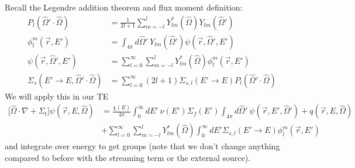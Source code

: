 \documentclass[12pt]{article}
\newcommand{\vOmega}{\ensuremath{\hat{\Omega}}}
\begin{document}
Recall the Legendre addition theorem and flux moment definition:
\begin{align*}
P_l(\vOmega' \cdot \vOmega) &= \frac{1}{2l+1}\sum_{m=-l}^l Y^*_{lm}(\vOmega)Y_{lm}(\vOmega')\\
\phi_{l}^{m}(\vec{r},E') &= \int_{4 \pi} d\vOmega'\: Y_{lm}(\vOmega') \psi(\vec{r}, \vOmega', E') \\
\psi(\vec{r}, \vOmega', E') &= \sum_{l=0}^{\infty} \sum_{m=-l}^l Y^*_{lm}(\vOmega)\phi_{l}^{m}(\vec{r},E')\\
\Sigma_s(E'\rightarrow E, \vOmega' \cdot \vOmega) &= \sum_{l=0}^{\infty} (2l+1) \Sigma_{s,l}(E'\rightarrow E) P_l(\vOmega' \cdot \vOmega)
\end{align*}
We will apply this in our TE 
%
\begin{align*}
\bigl[\vOmega \cdot \nabla + \Sigma_t\bigr] \psi(\vec{r}, E, \vOmega) &= \frac{\chi(E)}{4 \pi}\int_0^{\infty} dE' \: \nu(E') \Sigma_f(E') \int_{4 \pi} d\vOmega' \:\psi(\vec{r}, E', \vOmega') + q(\vec{r}, E, \vOmega)\\
 &+\sum_{l=0}^{\infty} \sum_{m=-l}^l Y^*_{lm}(\vOmega)\int_0^{\infty} dE' \Sigma_{s,l}(E'\rightarrow E) \phi_{l}^{m}(\vec{r},E')
\end{align*}
%
and integrate over energy to get groups (note that we don't change anything compared to before with the streaming term or the external source).
%
\end{document}
